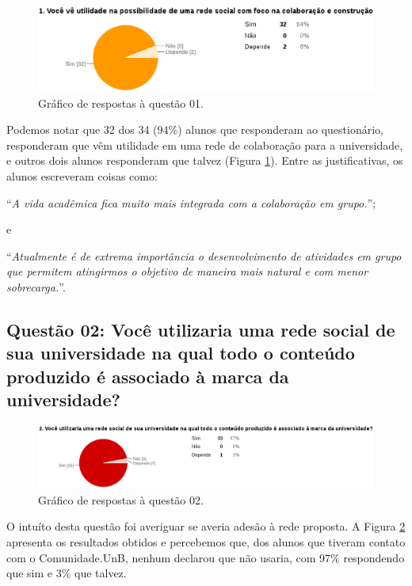 \begin{figure}[h!]
    \centering
    \includegraphics[keepaspectratio=true,scale=0.55]
      {figuras/p1.eps}
    \caption{Gráfico de respostas à questão 01.}
    \label{response:1}
\end{figure}

Podemos notar que 32 dos 34 (94\%) alunos que responderam ao questionário, responderam
que vêm utilidade em uma rede de colaboração para a universidade, e outros dois alunos
responderam que talvez (Figura \ref{response:1}).
%
Entre as justificativas, os alunos escreveram coisas como:

\begin{center}
``\textit{A vida acadêmica fica muito mais integrada com a colaboração em grupo.}'';
\end{center}

e

\begin{center}
``\textit{Atualmente é de extrema importância o desenvolvimento de atividades
em grupo que permitem atingirmos o objetivo de maneira mais natural e com menor
sobrecarga.}''.
\end{center}

\subsection*{Questão 02: Você utilizaria uma rede social de sua universidade na
qual todo o conteúdo produzido é associado à marca da universidade?}

\begin{figure}[h!]
    \centering
    \includegraphics[keepaspectratio=true,scale=0.55]
      {figuras/p2.eps}
    \caption{Gráfico de respostas à questão 02.}
    \label{response:2}
\end{figure}

O intuíto desta questão foi averiguar se averia adesão à rede proposta. A Figura
\ref{response:2} apresenta os resultados obtidos e percebemos que, dos alunos que
tiveram contato com o Comunidade.UnB, nenhum declarou que não usaria, com 97\%
respondendo que sim e 3\% que talvez.

